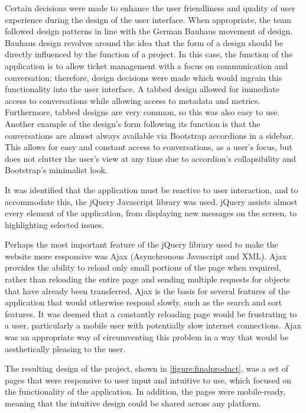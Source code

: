 \documentclass[a4paper]{l3proj}
\begin{document}
Certain decisions were made to enhance the user friendliness and quality of user experience during the design of the user interface. When appropriate, the team followed design patterns in line with the German Bauhaus movement of design. Bauhaus design revolves around the idea that the form of a design should be directly influenced by the function of a project. In this case, the function of the application is to allow ticket management with a focus on communication and conversation; therefore, design decisions were made which would ingrain this functionality into the user interface. A tabbed design allowed for immediate access to conversations while allowing access to metadata and metrics. Furthermore, tabbed designs are very common, so this was also easy to use. 
Another example of the design’s form following its function is that the conversations are almost always available via Bootstrap accordions in a sidebar. This allows for easy and constant access to conversations, as a user’s focus, but does not clutter the user’s view at any time due to accordion’s collapsibility and Bootstrap’s minimalist look.

It was identified that the application must be reactive to user interaction, and to accommodate this, the jQuery Javascript library was used. jQuery assists almost every element of the application, from displaying new messages on the screen, to highlighting selected issues. 

Perhaps the most important feature of the jQuery library used to make the website more responsive was Ajax (Asynchronous Javascript and XML). Ajax provides the ability to reload only small portions of the page when required, rather than reloading the entire page and sending multiple requests for objects that have already been transferred. Ajax is the basis for several features of the application that would otherwise respond slowly, such as the search and sort features. It was deemed that a constantly reloading page would be frustrating to a user, particularly a mobile user with potentially slow internet connections. Ajax was an appropriate way of circumventing this problem in a way that would be aesthetically pleasing to the user. 

The resulting design of the project, shown in \autoref{figure:finalproduct}, was a set of pages that were responsive to user input and intuitive to use, which focused on the functionality of the application. In addition, the pages were mobile-ready, meaning that the intuitive design could be shared across any platform. 
\end{document}
